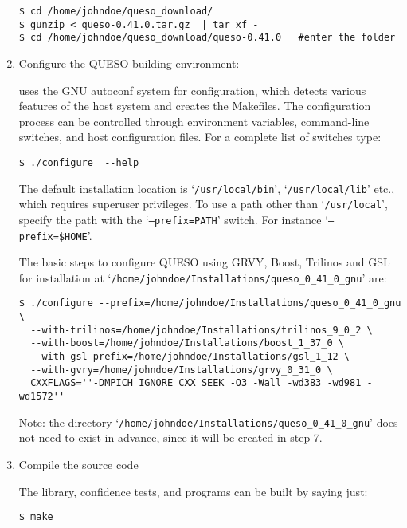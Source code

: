 \begin{enumerate}
{\begin{verbatim}
$ cd /home/johndoe/queso_download/
$ gunzip < queso-0.41.0.tar.gz  | tar xf -
$ cd /home/johndoe/queso_download/queso-0.41.0   #enter the folder 
\end{verbatim}
}
\item {Configure the QUESO building environment: %

\Queso{} uses the GNU autoconf system for configuration, which detects various features of the host system and creates the Makefiles. %
%  
% 
The configuration process can be controlled through environment variables, command-line switches, and host configuration files.
For a complete list of switches type:
\begin{verbatim}
$ ./configure  --help       
\end{verbatim}
%
 The default installation location is `\texttt{/usr/local/bin}', `\texttt{/usr/local/lib}' etc., which requires superuser privileges. To use a path
        other than `\texttt{/usr/local}', specify the path with the `\texttt{--prefix=PATH}' switch. For instance `\texttt{--prefix=\$HOME}'.



The basic steps to configure QUESO using GRVY, Boost, Trilinos and GSL for installation at `\texttt{/home/johndoe/Installations/queso\_0\_41\_0\_gnu}' are:
\begin{verbatim}
$ ./configure --prefix=/home/johndoe/Installations/queso_0_41_0_gnu \
  --with-trilinos=/home/johndoe/Installations/trilinos_9_0_2 \
  --with-boost=/home/johndoe/Installations/boost_1_37_0 \
  --with-gsl-prefix=/home/johndoe/Installations/gsl_1_12 \
  --with-gvry=/home/johndoe/Installations/grvy_0_31_0 \
  CXXFLAGS=''-DMPICH_IGNORE_CXX_SEEK -O3 -Wall -wd383 -wd981 -wd1572''
\end{verbatim}

Note: the directory `\Verb+/home/johndoe/Installations/queso_0_41_0_gnu+' does not need to exist in advance, since it will be created in step 7.
}

\item {Compile the \Queso{} source code %

The library, confidence tests, and programs can be built by saying just:
\begin{verbatim}
$ make
\end{verbatim}
}


\end{enumerate}
